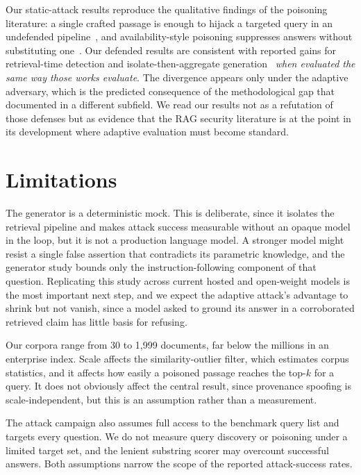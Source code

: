 Our static-attack results reproduce the qualitative findings of the poisoning literature: a
single crafted passage is enough to hijack a targeted query in an undefended
pipeline~\citep{zou2024,zhong2023}, and availability-style poisoning suppresses answers without
substituting one~\citep{shafran2024jamming}. Our defended results are consistent with reported
gains for retrieval-time detection and isolate-then-aggregate
generation~\citep{xiang2024robustrag,zhou2025trustrag} \emph{when evaluated the same way those
works evaluate}. The divergence appears only under the adaptive adversary, which is the
predicted consequence of the methodological gap that
\citet{carlini2017bypassing,athalye2018obfuscated,tramer2020adaptive} documented in a different
subfield. We read our results not as a refutation of those defenses but as evidence that the
RAG security literature is at the point in its development where adaptive evaluation must
become standard.

\section{Limitations}
\label{sec:limitations}

The generator is a deterministic mock. This is deliberate, since it isolates the retrieval
pipeline and makes attack success measurable without an opaque model in the loop, but it is not
a production language model. A stronger model might resist a single false assertion that
contradicts its parametric knowledge, and the generator study bounds only the
instruction-following component of that question. Replicating this study across current hosted
and open-weight models is the most important next step, and we expect the adaptive attack's
advantage to shrink but not vanish, since a model asked to ground its answer in a corroborated
retrieved claim has little basis for refusing.

Our corpora range from 30 to 1,999 documents, far below the millions in an enterprise index. Scale affects
the similarity-outlier filter, which estimates corpus statistics, and it affects how easily a
poisoned passage reaches the top-$k$ for a query. It does not obviously affect the central
result, since provenance spoofing is scale-independent, but this is an assumption rather than a
measurement.

The attack campaign also assumes full access to the benchmark query list and targets every
question. We do not measure query discovery or poisoning under a limited target set, and the
lenient substring scorer may overcount successful answers. Both assumptions narrow the scope of
the reported attack-success rates.

